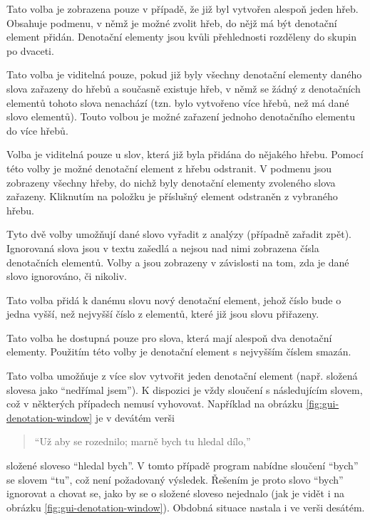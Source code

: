 \documentclass[dp.tex]{subfiles}
\begin{document}
\begin{description}[style=nextline]
	\item[\keys{Přidat do hřebu $\kern 10pt\triangleright$}] Tato volba je zobrazena pouze v případě, že již byl vytvořen alespoň jeden hřeb. Obsahuje podmenu, v němž je možné zvolit hřeb, do nějž má být denotační element přidán. Denotační elementy jsou kvůli přehlednosti rozděleny do skupin po dvaceti.

	\item[\keys{Přidat do jiného hřebu}] Tato volba je viditelná pouze, pokud již byly všechny denotační elementy daného slova zařazeny do hřebů a současně existuje hřeb, v němž se žádný z denotačních elementů tohoto slova nenachází (tzn. bylo vytvořeno více hřebů, než má dané slovo elementů). Touto volbou je možné zařazení jednoho denotačního elementu do více hřebů.

	\item[\keys{Odebrat z hřebu $\kern 10pt\triangleright$}] Volba je viditelná pouze u slov, která již byla přidána do nějakého hřebu. Pomocí této volby je možné denotační element z hřebu odstranit. V podmenu jsou zobrazeny všechny hřeby, do nichž byly denotační elementy zvoleného slova zařazeny. Kliknutím na položku je příslušný element odstraněn z vybraného hřebu.

	\item[\keys{Ignorovat} / \keys{Brát v potaz}] Tyto dvě volby umožňují dané slovo vyřadit z analýzy (případně zařadit zpět). Ignorovaná slova jsou v textu zašedlá a nejsou nad nimi zobrazena čísla denotačních elementů. Volby  a  jsou zobrazeny v závislosti na tom, zda je dané slovo  ignorováno, či nikoliv.

	\item[\keys{Přidat denotační element}] Tato volba přidá k danému slovu nový denotační element, jehož číslo bude o jedna vyšší, než nejvyšší číslo z elementů, které již jsou slovu přiřazeny. 

	\item[\keys{Odebrat denotační element}] Tato volba he dostupná pouze pro slova, která mají alespoň dva denotační elementy. Použitím této volby je denotační element s nejvyšším číslem smazán.

	\item[\keys{Sloučit s [\ldots]}] Tato volba umožňuje z více slov vytvořit jeden denotační element (např. složená slovesa jako \enquote{nedřímal jsem}). K dispozici je vždy sloučení s následujícím slovem, což v některých případech nemusí vyhovovat. Například na obrázku \ref{fig:gui-denotation-window} je v devátém verši

		\begin{verse}
		\enquote{Už aby se rozednilo; marně bych tu hledal dílo,}
		\end{verse}

	složené sloveso \enquote{hledal bych}. V tomto případě program nabídne sloučení \enquote{bych} se slovem \enquote{tu}, což není požadovaný výsledek. Řešením je proto slovo \enquote{bych} ignorovat a chovat se, jako by se o složené sloveso nejednalo (jak je vidět i na obrázku \ref{fig:gui-denotation-window}). Obdobná situace nastala i ve verši desátém.
\end{description}
\end{document}
